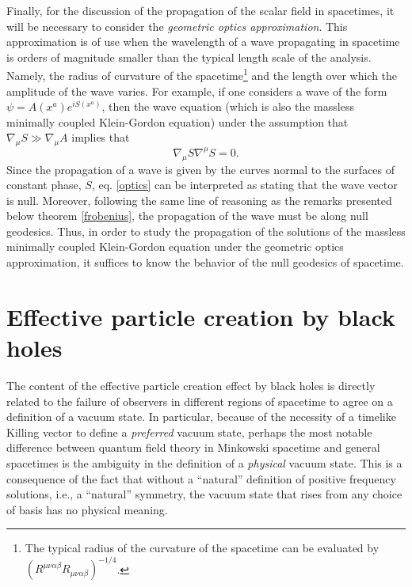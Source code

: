 \documentclass[
12pt,		%
openright,	%
twoside,  %
a4paper,			%
chapter=TITLE,		%
english,			%
french,				%
spanish,			%
brazil				%
]{USPSC-classe/USPSC}
\begin{document}
Finally, for the discussion of the propagation of the scalar field in spacetimes, it will be necessary to consider the \textit{geometric optics approximation}. This approximation is of use when the wavelength of a wave propagating in spacetime is orders of magnitude smaller than the typical length scale of the analysis. Namely, the radius of curvature of the spacetime\footnote{The typical radius of the curvature of the spacetime can be evaluated by $\left(R^{\mu\nu\alpha\beta}R_{\mu\nu\alpha\beta}\right)^{-1/4}$.} and the length over which the amplitude of the wave varies. For example, if one considers a wave of the form $\psi=A(x^{a})e^{iS(x^a)}$, then the wave equation (which is also the massless minimally coupled Klein-Gordon equation) under the assumption that $\nabla_{\mu}S\gg\nabla_{\mu}A$ implies that \cite{Fabbri2005}
\begin{equation}\label{optics}
    \nabla_{\mu}S\nabla^{\mu}S=0.
\end{equation}
Since the propagation of a wave is given by the curves normal to the surfaces of constant phase, $S$, eq. \ref{optics} can be interpreted as stating that the wave vector is null. Moreover, following the same line of reasoning as the remarks presented below theorem \ref{frobenius}, the propagation of the wave must be along null geodesics. Thus, in order to study the propagation of the solutions of the massless minimally coupled Klein-Gordon equation under the geometric optics approximation, it suffices to know the behavior of the null geodesics of spacetime. 


\section{Effective particle creation by black holes}\label{creation}

The content of the effective particle creation effect by black holes is directly related to the failure of observers in different regions of spacetime to agree on a definition of a vacuum state. In particular, because of the necessity of a timelike Killing vector to define a \textit{preferred} vacuum state, perhaps the most notable difference between quantum field theory in Minkowski spacetime and general spacetimes is the ambiguity in the definition of a \textit{physical} vacuum state. This is a consequence of the fact that without a ``natural'' definition of positive frequency solutions, i.e., a ``natural'' symmetry, the vacuum state that rises from any choice of basis has no physical meaning. 
\end{document}

